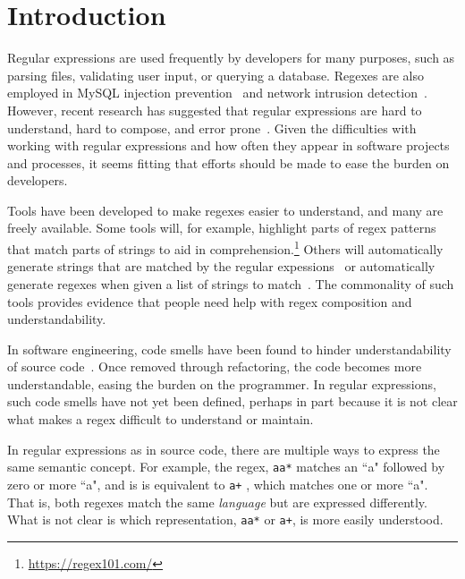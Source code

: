 \section{Introduction }

Regular expressions are used frequently by developers for many purposes, such as parsing files, validating user input, or querying a database.
Regexes are also employed in MySQL injection prevention~\cite{Yeole:2011:ADT:1980022.1980229} and network intrusion detection~\cite{network}. 
However, recent research has suggested that regular expressions  are hard to understand, hard to compose, and error prone~\cite{Spishak:2012:TSR:2318202.2318207}.
Given the difficulties with working with regular expressions and how often they appear in software projects and processes, it seems fitting that efforts should be made to ease the burden on developers.

Tools have been developed to make regexes easier to understand, and many are freely available.
Some tools will, for example, highlight parts of regex patterns that match parts of strings to aid in comprehension.\footnote{\url{https://regex101.com/}}
Others will automatically generate strings that are matched by the regular expessions~\cite{hampi} 
or  automatically generate regexes when given a list of strings to match~\cite{Babbar:2010:CBA:1871840.1871848, Li:2008:REL:1613715.1613719}.
The commonality of such tools provides evidence that people need help with regex composition and understandability.

In software engineering, code smells have been found to hinder understandability of source code~\cite{abbes2011empirical, du2006does}.
Once removed through refactoring, the code becomes more understandable, easing the burden on the programmer.
In regular expressions, such code smells have not yet been defined, perhaps in part because it is not clear what makes a regex difficult to understand or maintain. 

In regular expressions as in source code, there are multiple ways to express the same semantic concept.
For example, the regex, \verb!aa*! matches an ``a" followed by zero or more ``a", and is is equivalent to \verb!a+! , which matches one or more ``a".
That is, both regexes match the same \emph{language} but are expressed differently. What is not clear is which representation,  \verb!aa*!  or  \verb!a+!, is more easily understood.

